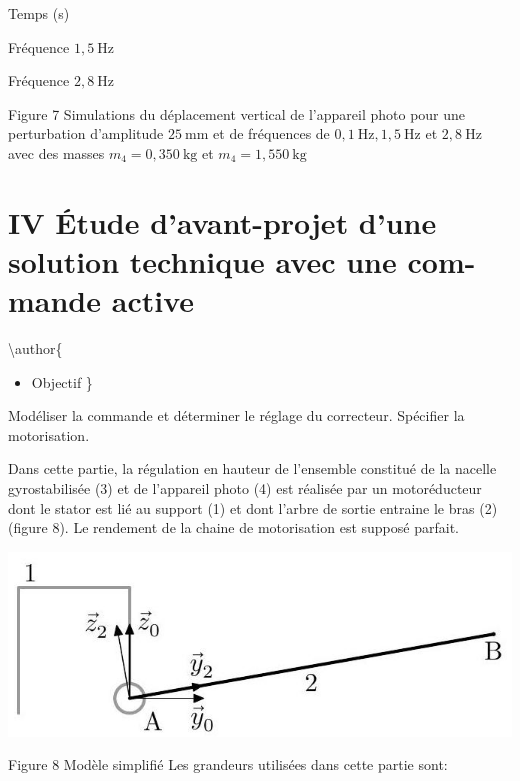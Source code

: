 \documentclass[10pt]{article}
\begin{document}
Temps (s)

Fréquence $1,5 \mathrm{~Hz}$

Fréquence $2,8 \mathrm{~Hz}$

Figure 7 Simulations du déplacement vertical de l'appareil photo pour une perturbation d'amplitude $25 \mathrm{~mm}$ et de fréquences de $0,1 \mathrm{~Hz}, 1,5 \mathrm{~Hz}$ et $2,8 \mathrm{~Hz}$ avec des masses $m_{4}=0,350 \mathrm{~kg}$ et $m_{4}=1,550 \mathrm{~kg}$

\section*{IV Étude d'avant-projet d'une solution technique avec une com- mande active }
\textbackslash author\{

\begin{itemize}
  \item Objectif
\}
\end{itemize}

Modéliser la commande et déterminer le réglage du correcteur. Spécifier la motorisation.

Dans cette partie, la régulation en hauteur de l'ensemble constitué de la nacelle gyrostabilisée (3) et de l'appareil photo (4) est réalisée par un motoréducteur dont le stator est lié au support (1) et dont l'arbre de sortie entraine le bras (2) (figure 8). Le rendement de la chaine de motorisation est supposé parfait.

\begin{center}
\includegraphics[max width=\textwidth]{2022_12_31_ed674c1a831ea1bff3a0g-07(3)}
\end{center}

Figure 8 Modèle simplifié Les grandeurs utilisées dans cette partie sont:
\end{document}

